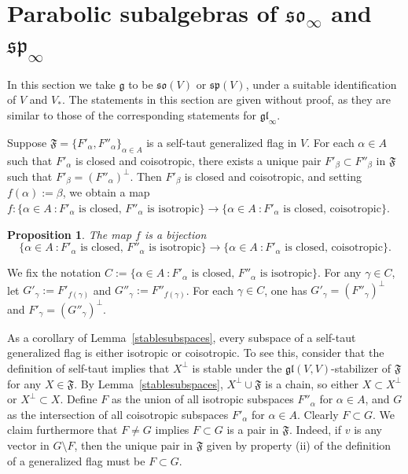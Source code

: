 \documentclass{article}
\def\gl{\mathfrak {gl}}
\def\g{\mathfrak {g}}
\def\so{\mathfrak{so}}
\def\sp{\mathfrak{sp}}
\def\F{\mathfrak{F}}
\newtheorem{prop}[thm]{Proposition}
\begin{document}
\section{Parabolic subalgebras of $\so_\infty$ and $\sp_\infty$}\label{secParsosp}


In this section we take $\g$ to be $\so(V)$ or $\sp(V)$, under a suitable identification of $V$ and $V_*$.  The statements in this section are given without proof, as they are similar to those of the corresponding statements for $\gl_\infty$.  

Suppose $\F = \{F'_\alpha , F''_\alpha \}_{\alpha \in A}$ is a self-taut generalized flag in $V$.  
For each $\alpha \in A$ such that $F'_\alpha$ is closed and coisotropic, there exists a unique pair $F'_\beta \subset F''_\beta$ in $\F$ such that $F'_\beta = (F''_\alpha)^\perp$.  Then $F'_\beta$ is closed and coisotropic, and setting $f(\alpha) := \beta$, we obtain a map $f \colon \{ \alpha \in A ~\colon F'_\alpha \textrm{ is closed, }F''_\alpha \textrm{ is isotropic} \} \rightarrow \{ \alpha \in A ~\colon F'_\alpha \textrm{ is closed, coisotropic} \}$.  


\begin{prop} \label{isodefinec}
The map $f$ is a bijection
$$\{ \alpha \in A ~\colon F'_\alpha \textrm{ is closed, }F''_\alpha \textrm{ is isotropic} \} \rightarrow \{ \alpha \in A ~\colon F'_\alpha \textrm{ is closed, coisotropic} \}.$$
\end{prop}


We fix the notation $C := \{ \alpha \in A ~\colon F'_\alpha \textrm{ is closed, }F''_\alpha \textrm{ is isotropic} \}$.
For any $\gamma \in C$, let $G'_\gamma := F'_{f(\gamma)}$ and $G''_\gamma := F''_{f(\gamma)}$.
For each $\gamma \in C$, one has $G'_\gamma = (F''_\gamma)^\perp$ and $F'_\gamma = (G''_\gamma)^\perp$.


As a corollary of Lemma~\ref{stablesubspaces}, every subspace of a self-taut generalized flag is either isotropic or coisotropic.  To see this, consider that the definition of self-taut implies that $X^\perp$ is stable under the $\gl(V,V)$-stabilizer of $\F$ for any $X \in \F$.  By Lemma~\ref{stablesubspaces}, $X^\perp \cup \F$ is a chain, so either $X \subset X^\perp$ or $X^\perp \subset X$.  Define $F$ as the union of all isotropic subspaces $F''_\alpha$ for $\alpha \in A$, and $G$ as the intersection of all coisotropic subspaces $F'_\alpha$ for $\alpha \in A$.  Clearly $F \subset G$.  We claim furthermore that $F  \neq G$ implies $F \subset G$ is a pair in $\F$.  Indeed, if $v$ is any vector in $G \setminus F$, then the unique pair in $\F$ given by property (ii) of the definition of a generalized flag must be $F \subset G$.
\end{document}
